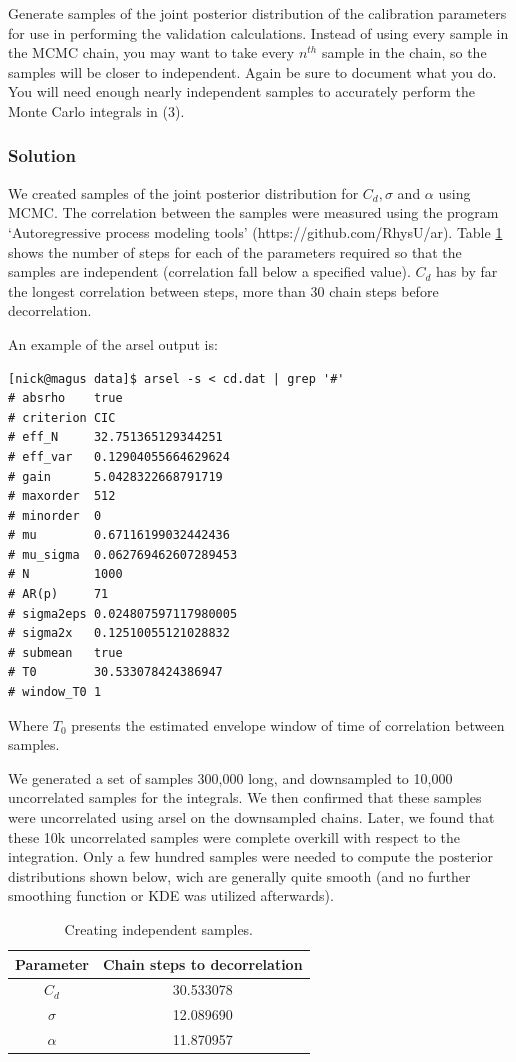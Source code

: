 \documentclass{article}
\providecommand{\tabularnewline}{\\}
\begin{document}
Generate samples of the joint posterior distribution of the calibration
parameters for use in performing the validation calculations. Instead
of using every sample in the MCMC chain, you may want to take every
$n^{th}$ sample in the chain, so the samples will be closer to independent.
Again be sure to document what you do. You will need enough nearly
independent samples to accurately perform the Monte Carlo integrals
in (3).


\subsubsection*{Solution}

We created samples of the joint posterior distribution for $C_{d},\sigma$
and $\alpha$ using MCMC. The correlation between the samples were
measured using the program `Autoregressive process modeling tools'
(https://github.com/RhysU/ar). Table \ref{table:creatingindesamples}
shows the number of steps for each of the parameters required so that
the samples are independent (correlation fall below a specified value).
$C_{d}$ has by far the longest correlation between steps, more than
30 chain steps before decorrelation. 

An example of the arsel output is:
\begin{verbatim}
[nick@magus data]$ arsel -s < cd.dat | grep '#'
# absrho    true
# criterion CIC
# eff_N     32.751365129344251
# eff_var   0.12904055664629624
# gain      5.0428322668791719
# maxorder  512
# minorder  0
# mu        0.67116199032442436
# mu_sigma  0.062769462607289453
# N         1000
# AR(p)     71
# sigma2eps 0.024807597117980005
# sigma2x   0.12510055121028832
# submean   true
# T0        30.533078424386947
# window_T0 1
\end{verbatim}
Where $T_0$ presents the estimated envelope window of time of
correlation between samples. 

We generated a set of samples 300,000 long, and downsampled to 10,000
uncorrelated samples for the integrals. We then confirmed that these
samples were uncorrelated using arsel on the downsampled chains. Later,
we found that these 10k uncorrelated samples were complete overkill with
respect to the integration. Only a few hundred samples were needed to
compute the posterior distributions shown below, wich are generally
quite smooth (and no further smoothing function or KDE was utilized afterwards). 

\begin{table}
\begin{centering}
\begin{tabular}{|c|c|}
\hline 
Parameter & Chain steps to decorrelation\tabularnewline
\hline 
\hline 
$C_{d}$ & 30.533078\tabularnewline
\hline 
$\sigma$ & 12.089690\tabularnewline
\hline 
$\alpha$ & 11.870957\tabularnewline
\hline 
\end{tabular}
\par\end{centering}

\caption{Creating independent samples.}


\label{table:creatingindesamples}
\end{table}
\end{document}
